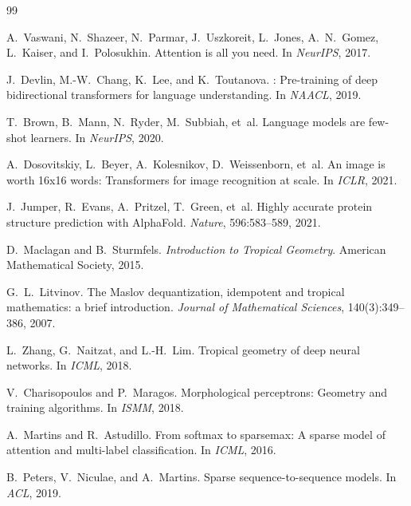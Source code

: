 \documentclass[11pt,twocolumn]{article}
\begin{document}

\begin{thebibliography}{99}

A.~Vaswani, N.~Shazeer, N.~Parmar, J.~Uszkoreit, L.~Jones, A.~N.~Gomez,
L.~Kaiser, and I.~Polosukhin.
\newblock Attention is all you need.
\newblock In \emph{NeurIPS}, 2017.

J.~Devlin, M.-W.~Chang, K.~Lee, and K.~Toutanova.
: Pre-training of deep bidirectional transformers for language
  understanding.
\newblock In \emph{NAACL}, 2019.

T.~Brown, B.~Mann, N.~Ryder, M.~Subbiah, et~al.
\newblock Language models are few-shot learners.
\newblock In \emph{NeurIPS}, 2020.

A.~Dosovitskiy, L.~Beyer, A.~Kolesnikov, D.~Weissenborn, et~al.
\newblock An image is worth 16x16 words: Transformers for image recognition at
  scale.
\newblock In \emph{ICLR}, 2021.

J.~Jumper, R.~Evans, A.~Pritzel, T.~Green, et~al.
\newblock Highly accurate protein structure prediction with {AlphaFold}.
\newblock \emph{Nature}, 596:583--589, 2021.

D.~Maclagan and B.~Sturmfels.
\newblock \emph{Introduction to Tropical Geometry}.
\newblock American Mathematical Society, 2015.

G.~L.~Litvinov.
\newblock The {Maslov} dequantization, idempotent and tropical mathematics: a
  brief introduction.
\newblock \emph{Journal of Mathematical Sciences}, 140(3):349--386, 2007.

L.~Zhang, G.~Naitzat, and L.-H.~Lim.
\newblock Tropical geometry of deep neural networks.
\newblock In \emph{ICML}, 2018.

V.~Charisopoulos and P.~Maragos.
\newblock Morphological perceptrons: Geometry and training algorithms.
\newblock In \emph{ISMM}, 2018.

A.~Martins and R.~Astudillo.
\newblock From softmax to sparsemax: A sparse model of attention and
  multi-label classification.
\newblock In \emph{ICML}, 2016.

B.~Peters, V.~Niculae, and A.~Martins.
\newblock Sparse sequence-to-sequence models.
\newblock In \emph{ACL}, 2019.


\end{thebibliography}
\end{document}
